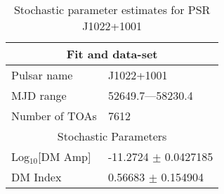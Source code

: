\documentclass{article}
\begin{document}
\begin{table*}
\caption{Stochastic parameter estimates for PSR J1022+1001}
\begin{tabular}{ll}
\hline\hline
\multicolumn{2}{c}{Fit and data-set} \\ 
\hline
Pulsar name\dotfill & J1022+1001 \\ 
MJD range\dotfill & 52649.7---58230.4 \\ 
Number of TOAs\dotfill & 7612 \\
\hline
\multicolumn{2}{c}{Stochastic Parameters} \\ 
\hline
Log$_{10}$[DM Amp] \dotfill & -11.2724 $\pm$ 0.0427185  \\ 
DM Index \dotfill & 0.56683 $\pm$ 0.154904  \\ 
\hline
\end{tabular}
\label{Table:J1022+1001}
\end{table*} 
\end{document}
